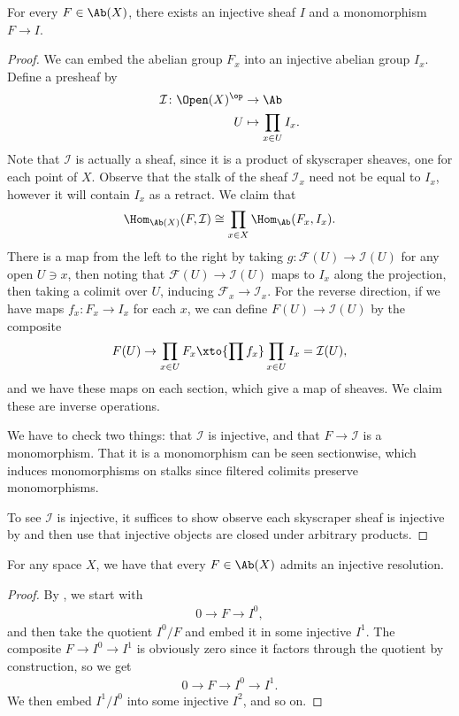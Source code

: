 \documentclass[11pt]{book}
\begin{document}
\begin{proposition}\label{prop:abX-enough-injectives} 
For every $F \in \Ab(X)$, there exists an injective sheaf $I$ and a monomorphism $F \to I$.
\end{proposition}
\begin{proof} We can embed the abelian group $F_x$ into an injective abelian group $I_x$. Define a presheaf by
\begin{align*}
    \mathcal{I} \colon \Open(X)^\op &\to \Ab \\
    U &\mapsto \prod_{x\in U}I_x.
\end{align*}
Note that $\mathcal{I}$ is actually a sheaf, since it is a product of skyscraper sheaves, one for each point of $X$. Observe that the stalk of the sheaf $\mathcal{I}_x$ need not be equal to $I_x$, however it will contain $I_x$ as a retract. We claim that
\begin{align*}
    \Hom_{\Ab(X)}(F,\mathcal{I}) \cong \prod_{x\in X}\Hom_\Ab(F_x,I_x).
\end{align*}
There is a map from the left to the right by taking $g \colon \mathcal{F}(U) \to \mathcal{I}(U)$ for any open $U\ni x$, then noting that $\mathcal{F}(U) \to \mathcal{I}(U)$ maps to $I_x$ along the projection, then taking a colimit over $U$, inducing $\mathcal{F}_x \to \mathcal{I}_x$. For the reverse direction, if we have maps $f_x \colon F_x \to I_x$ for each $x$, we can define $F(U) \to \mathcal{I}(U)$ by the composite
\begin{align*}
    F(U) \to \prod_{x\in U} F_x \xto{\prod f_x} \prod_{x\in U} I_x = \mathcal{I}(U),
\end{align*}
and we have these maps on each section, which give a map of sheaves. We claim these are inverse operations.

We have to check two things: that $\mathcal{I}$ is injective, and that $F \to \mathcal{I}$ is a monomorphism. That it is a monomorphism can be seen sectionwise, which induces monomorphisms on stalks since filtered colimits preserve monomorphisms.

To see $\mathcal{I}$ is injective, it suffices to show observe each skyscraper sheaf is injective by  and then use that injective objects are closed under arbitrary products.
\end{proof}

\begin{corollary} For any space $X$, we have that every $F\in\Ab(X)$ admits an injective resolution.
\end{corollary}
\begin{proof} By , we start with
\begin{align*}
    0 \to F \to I^0,
\end{align*}
and then take the quotient $I^0/F$ and embed it in some injective $I^1$. The composite $F \to I^0 \to I^1$ is obviously zero since it factors through the quotient by construction, so we get
\begin{align*}
    0 \to F \to I^0 \to I^1.
\end{align*}
We then embed $I^1/I^0$ into some injective $I^2$, and so on.
\end{proof}
\end{document}

